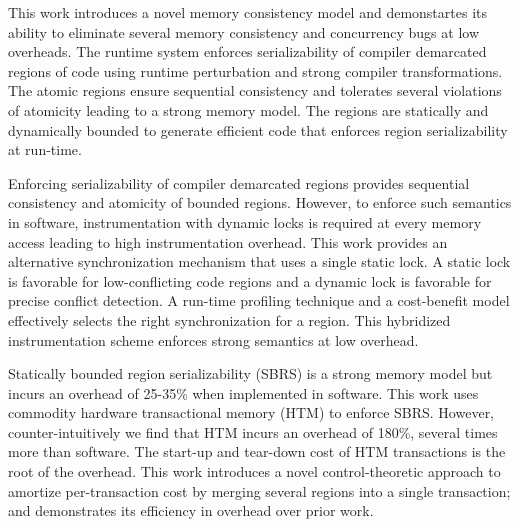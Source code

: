 \documentclass[10pt,a4paper,roman]{moderncv}
\begin{document}
This work introduces a novel memory consistency model and demonstartes its ability to eliminate several memory consistency and concurrency bugs at low overheads. The runtime system enforces serializability of compiler demarcated regions of code using runtime perturbation and strong compiler transformations. The atomic regions ensure sequential consistency and tolerates several violations of atomicity leading to a strong memory model. The regions are statically and dynamically bounded to generate efficient code that enforces region serializability at run-time.

Enforcing serializability of compiler demarcated regions provides sequential consistency and atomicity of bounded regions. However, to enforce
such semantics in software, instrumentation with dynamic locks is required at every memory access leading to high instrumentation overhead. This work provides an alternative synchronization mechanism that uses a single static lock. A static lock is favorable for low-conflicting code regions and a dynamic lock is favorable for precise conflict detection. A run-time profiling technique and a cost-benefit model effectively selects the right synchronization for a region. This hybridized instrumentation scheme enforces strong semantics at low overhead.

Statically bounded region serializability (SBRS) is a strong memory model but incurs an overhead of 25-35\% when implemented in software. This work uses commodity hardware transactional memory (HTM) to enforce SBRS. However, counter-intuitively we find that HTM incurs an overhead of 180\%, several times more than software. The start-up and tear-down cost of HTM transactions is the root of the overhead. This work introduces a novel control-theoretic approach to amortize per-transaction cost by merging several regions into a single transaction; and demonstrates its efficiency in overhead over prior work.
\end{document}
